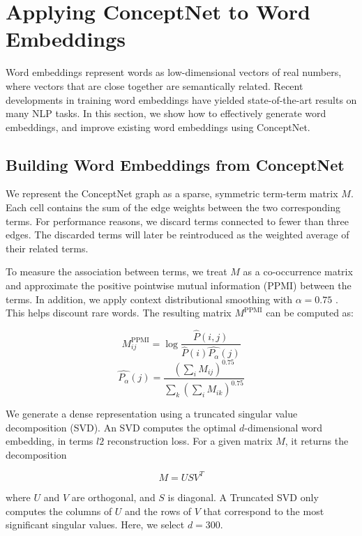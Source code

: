 \documentclass[letterpaper]{article}
\begin{document}
\section{Applying ConceptNet to Word Embeddings}
\label{applying-conceptnet-to-word-embeddings}

Word embeddings represent words as low-dimensional vectors of real numbers,
where vectors that are close together are semantically related. Recent
developments in training word embeddings have yielded state-of-the-art results
on many NLP tasks. In this section, we show how to effectively generate
word embeddings, and improve existing word embeddings using ConceptNet.

\subsection{Building Word Embeddings from ConceptNet}


We represent the ConceptNet graph as a sparse, symmetric term-term matrix $M$.
Each cell contains the sum of the edge weights between the two corresponding
terms. For performance reasons, we discard terms connected to fewer than three
edges. The discarded terms will later be reintroduced as the weighted average of
their related terms.

To measure the association between terms, we treat $M$ as a co-occurrence
matrix and approximate the positive pointwise mutual information (PPMI) between
the terms. In addition, we apply context distributional smoothing with
$\alpha=0.75$ \cite{levy2015embeddings}. This helps discount rare words. The
resulting matrix $M^\text{PPMI}$ can be computed as:

$$
M^\text{PPMI}_{ij} =
\log \frac
  {\hat{P} \left(i, j\right)}
  {\hat{P} \left(i\right) \hat{P_\alpha} \left(j\right)}
$$
$$
\hat{P_\alpha} \left(j\right) =
\frac
  {\left(\sum_i{M_{ij}}\right)^{0.75}}
  {\sum_k{\left(\sum_i{M_{ik}}\right)^{0.75}}}
$$

We generate a dense representation using a truncated singular value
decomposition (SVD). An SVD computes the optimal $d$-dimensional word embedding,
in terms $l2$ reconstruction loss. For a given matrix $M$, it returns the
decomposition

$$
M = USV^T
$$

where $U$ and $V$ are orthogonal, and $S$ is diagonal. A Truncated SVD only
computes the columns of $U$ and the rows of $V$ that correspond to the most
significant singular values. Here, we select $d=300$.
\end{document}
